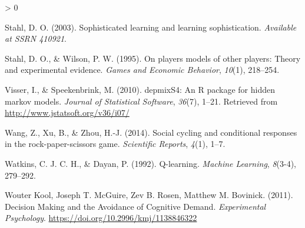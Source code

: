 \documentclass[
  english,
  man,floatsintext]{apa6}
\newlength{\cslhangindent}
\newenvironment{CSLReferences}[2] %
 {%
  \setlength{\parindent}{0pt}
  \ifodd #1 \everypar{\setlength{\hangindent}{\cslhangindent}}\ignorespaces\fi
  \ifnum #2 > 0
  \setlength{\parskip}{#2\baselineskip}
  \fi
 }%
 {}
\begin{document}
\begin{CSLReferences}{1}{0}
\leavevmode\hypertarget{ref-stahl2003sophisticated}{}%
Stahl, D. O. (2003). Sophisticated learning and learning sophistication. \emph{Available at SSRN 410921}.

\leavevmode\hypertarget{ref-stahl1995players}{}%
Stahl, D. O., \& Wilson, P. W. (1995). {On players models of other players: Theory and experimental evidence}. \emph{Games and Economic Behavior}, \emph{10}(1), 218--254.

\leavevmode\hypertarget{ref-R-depmixS4}{}%
Visser, I., \& Speekenbrink, M. (2010). {depmixS4}: An {R} package for hidden markov models. \emph{Journal of Statistical Software}, \emph{36}(7), 1--21. Retrieved from \url{http://www.jstatsoft.org/v36/i07/}

\leavevmode\hypertarget{ref-wang2014social}{}%
Wang, Z., Xu, B., \& Zhou, H.-J. (2014). Social cycling and conditional responses in the rock-paper-scissors game. \emph{Scientific Reports}, \emph{4}(1), 1--7.

\leavevmode\hypertarget{ref-watkins1992q}{}%
Watkins, C. J. C. H., \& Dayan, P. (1992). {Q-learning}. \emph{Machine Learning}, \emph{8}(3-4), 279--292.

\leavevmode\hypertarget{ref-Kool_2011}{}%
Wouter Kool, Joseph T. McGuire, Zev B. Rosen, Matthew M. Bovinick. (2011). {Decision Making and the Avoidance of Cognitive Demand}. \emph{Experimental Psychology}. \url{https://doi.org/10.2996/kmj/1138846322}

\end{CSLReferences}
\end{document}

